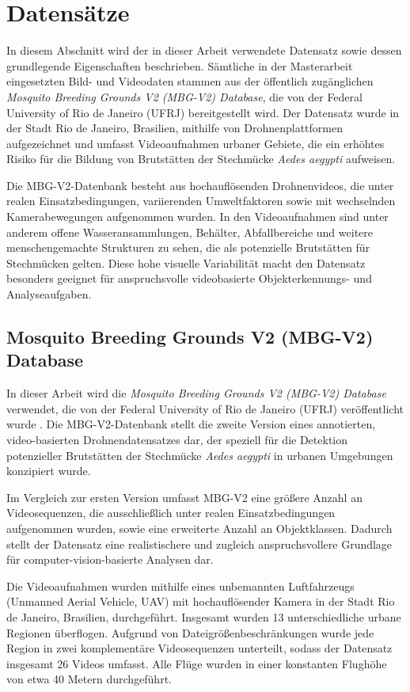 \section{Datensätze}
\label{sec:datasets}

In diesem Abschnitt wird der in dieser Arbeit verwendete Datensatz sowie dessen
grundlegende Eigenschaften beschrieben. Sämtliche in der Masterarbeit eingesetzten
Bild- und Videodaten stammen aus der öffentlich zugänglichen
\textit{Mosquito Breeding Grounds V2 (MBG-V2) Database}, die von der
Federal University of Rio de Janeiro (UFRJ) bereitgestellt wird. Der Datensatz
wurde in der Stadt Rio de Janeiro, Brasilien, mithilfe von Drohnenplattformen
aufgezeichnet und umfasst Videoaufnahmen urbaner Gebiete, die ein erhöhtes
Risiko für die Bildung von Brutstätten der Stechmücke \textit{Aedes aegypti}
aufweisen.

Die MBG-V2-Datenbank besteht aus hochauflösenden Drohnenvideos, die unter realen
Einsatzbedingungen, variierenden Umweltfaktoren sowie mit wechselnden
Kamerabewegungen aufgenommen wurden. In den Videoaufnahmen sind unter anderem
offene Wasseransammlungen, Behälter, Abfallbereiche und weitere menschengemachte
Strukturen zu sehen, die als potenzielle Brutstätten für Stechmücken gelten.
Diese hohe visuelle Variabilität macht den Datensatz besonders geeignet für
anspruchsvolle videobasierte Objekterkennungs- und Analyseaufgaben.

\subsection{Mosquito Breeding Grounds V2 (MBG-V2) Database}

In dieser Arbeit wird die \textit{Mosquito Breeding Grounds V2 (MBG-V2) Database}
verwendet, die von der Federal University of Rio de Janeiro (UFRJ) veröffentlicht
wurde \cite{passos2024mbgv2}. Die MBG-V2-Datenbank stellt die zweite Version eines
annotierten, video-basierten Drohnendatensatzes dar, der speziell für die
Detektion potenzieller Brutstätten der Stechmücke \textit{Aedes aegypti} in
urbanen Umgebungen konzipiert wurde.

Im Vergleich zur ersten Version umfasst MBG-V2 eine größere Anzahl an
Videosequenzen, die ausschließlich unter realen Einsatzbedingungen aufgenommen
wurden, sowie eine erweiterte Anzahl an Objektklassen. Dadurch stellt der
Datensatz eine realistischere und zugleich anspruchsvollere Grundlage für
computer-vision-basierte Analysen dar.

Die Videoaufnahmen wurden mithilfe eines unbemannten Luftfahrzeugs
(Unmanned Aerial Vehicle, UAV) mit hochauflösender Kamera in der Stadt
Rio de Janeiro, Brasilien, durchgeführt. Insgesamt wurden 13 unterschiedliche
urbane Regionen überflogen. Aufgrund von Dateigrößenbeschränkungen wurde jede
Region in zwei komplementäre Videosequenzen unterteilt, sodass der Datensatz
insgesamt 26 Videos umfasst. Alle Flüge wurden in einer konstanten Flughöhe von
etwa 40 Metern durchgeführt.

